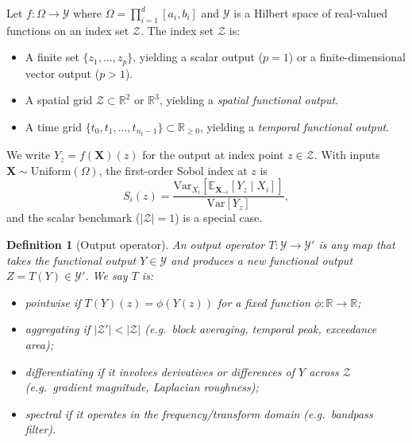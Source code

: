 \documentclass[11pt,onecolumn]{article}
\newtheorem{definition}{Definition}
\begin{document}
Let $f: \Omega \to \mathcal{Y}$ where $\Omega = \prod_{i=1}^d [a_i, b_i]$ and
$\mathcal{Y}$ is a Hilbert space of real-valued functions on an index set
$\mathcal{Z}$.  The index set $\mathcal{Z}$ is:
\begin{itemize}[noitemsep]
  \item A finite set $\{z_1, \ldots, z_p\}$, yielding a scalar output ($p=1$)
    or a finite-dimensional vector output ($p > 1$).
  \item A spatial grid $\mathcal{Z} \subset \mathbb{R}^2$ or $\mathbb{R}^3$,
    yielding a \emph{spatial functional output}.
  \item A time grid $\{t_0, t_1, \ldots, t_{n_t-1}\} \subset \mathbb{R}_{\geq 0}$,
    yielding a \emph{temporal functional output}.
\end{itemize}
We write $Y_z = f(\mathbf{X})(z)$ for the output at index point $z \in \mathcal{Z}$.
With inputs $\mathbf{X} \sim \mathrm{Uniform}(\Omega)$, the first-order Sobol
index at $z$ is
\begin{equation}
  S_i(z) = \frac{\mathrm{Var}_{X_i}[\mathbb{E}_{\mathbf{X}_{\sim i}}[Y_z \mid X_i]]}
                 {\mathrm{Var}[Y_z]},
  \label{eq:pointwise_sobol}
\end{equation}
and the scalar benchmark ($|\mathcal{Z}|=1$) is a special case.

\begin{definition}[Output operator]
An \emph{output operator} $T: \mathcal{Y} \to \mathcal{Y}'$ is any map that
takes the functional output $Y \in \mathcal{Y}$ and produces a new functional
output $Z = T(Y) \in \mathcal{Y}'$.  We say $T$ is:
\begin{itemize}[noitemsep]
  \item \emph{pointwise} if $T(Y)(z) = \phi(Y(z))$ for a fixed function
    $\phi: \mathbb{R} \to \mathbb{R}$;
  \item \emph{aggregating} if $|\mathcal{Z}'| < |\mathcal{Z}|$
    (e.g.\ block averaging, temporal peak, exceedance area);
  \item \emph{differentiating} if it involves derivatives or differences of
    $Y$ across $\mathcal{Z}$ (e.g.\ gradient magnitude, Laplacian roughness);
  \item \emph{spectral} if it operates in the frequency/transform domain
    (e.g.\ bandpass filter).
\end{itemize}
\end{definition}
\end{document}

